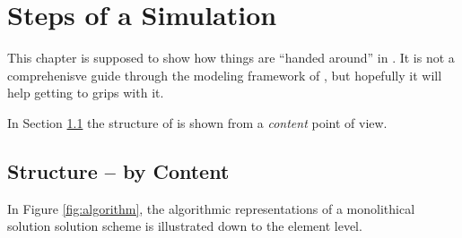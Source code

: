 \section{Steps of a \Dumux Simulation}
\label{flow}


This chapter is supposed to show how things are ``handed around'' in \Dumux. It
is not a comprehenisve guide through the modeling framework of \Dumux, but
hopefully it will help getting to grips with it.

In Section \ref{content} the structure of \Dumux is shown from a \emph{content}
point of view.

\subsection{Structure -- by Content}

\label{content}
In Figure \ref{fig:algorithm}, the algorithmic representations of a monolithical
solution solution scheme is illustrated down to the element level.

